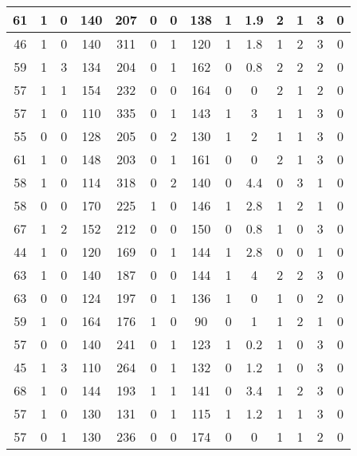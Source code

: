 \documentclass{article}
\begin{document}
\begin{longtable}{|c|c|c|c|c|c|c|c|c|c|c|c|c|c|}
61 & 1 & 0 & 140 & 207 & 0 & 0 & 138 & 1 & 1.9 & 2 & 1 & 3 & 0\\ \hline
46 & 1 & 0 & 140 & 311 & 0 & 1 & 120 & 1 & 1.8 & 1 & 2 & 3 & 0\\ \hline
59 & 1 & 3 & 134 & 204 & 0 & 1 & 162 & 0 & 0.8 & 2 & 2 & 2 & 0\\ \hline
57 & 1 & 1 & 154 & 232 & 0 & 0 & 164 & 0 & 0 & 2 & 1 & 2 & 0\\ \hline
57 & 1 & 0 & 110 & 335 & 0 & 1 & 143 & 1 & 3 & 1 & 1 & 3 & 0\\ \hline
55 & 0 & 0 & 128 & 205 & 0 & 2 & 130 & 1 & 2 & 1 & 1 & 3 & 0\\ \hline
61 & 1 & 0 & 148 & 203 & 0 & 1 & 161 & 0 & 0 & 2 & 1 & 3 & 0\\ \hline
58 & 1 & 0 & 114 & 318 & 0 & 2 & 140 & 0 & 4.4 & 0 & 3 & 1 & 0\\ \hline
58 & 0 & 0 & 170 & 225 & 1 & 0 & 146 & 1 & 2.8 & 1 & 2 & 1 & 0\\ \hline
67 & 1 & 2 & 152 & 212 & 0 & 0 & 150 & 0 & 0.8 & 1 & 0 & 3 & 0\\ \hline
44 & 1 & 0 & 120 & 169 & 0 & 1 & 144 & 1 & 2.8 & 0 & 0 & 1 & 0\\ \hline
63 & 1 & 0 & 140 & 187 & 0 & 0 & 144 & 1 & 4 & 2 & 2 & 3 & 0\\ \hline
63 & 0 & 0 & 124 & 197 & 0 & 1 & 136 & 1 & 0 & 1 & 0 & 2 & 0\\ \hline
59 & 1 & 0 & 164 & 176 & 1 & 0 & 90 & 0 & 1 & 1 & 2 & 1 & 0\\ \hline
57 & 0 & 0 & 140 & 241 & 0 & 1 & 123 & 1 & 0.2 & 1 & 0 & 3 & 0\\ \hline
45 & 1 & 3 & 110 & 264 & 0 & 1 & 132 & 0 & 1.2 & 1 & 0 & 3 & 0\\ \hline
68 & 1 & 0 & 144 & 193 & 1 & 1 & 141 & 0 & 3.4 & 1 & 2 & 3 & 0\\ \hline
57 & 1 & 0 & 130 & 131 & 0 & 1 & 115 & 1 & 1.2 & 1 & 1 & 3 & 0\\ \hline
57 & 0 & 1 & 130 & 236 & 0 & 0 & 174 & 0 & 0 & 1 & 1 & 2 & 0\\ \hline
\end{longtable}
\end{document}
